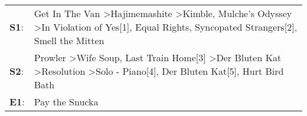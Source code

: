 \begin{supertabular}{p{0.03\textwidth}p{0.92\textwidth}}
 \textbf{S1}:  &  Get In The Van\textsuperscript{} \textgreater \enspace Hajimemashite\textsuperscript{} \textgreater \enspace Kimble\textsuperscript{}, \enspace Mulche's Odyssey\textsuperscript{} \textgreater \enspace In Violation of Yes[1]\textsuperscript{}, \enspace Equal Rights\textsuperscript{}, \enspace Syncopated Strangers[2]\textsuperscript{}, \enspace Smell the Mitten\textsuperscript{}  \enspace  \\
 \textbf{S2}:  &        Prowler\textsuperscript{} \textgreater \enspace Wife Soup\textsuperscript{}, \enspace Last Train Home[3]\textsuperscript{} \textgreater \enspace Der Bluten Kat\textsuperscript{} \textgreater \enspace Resolution\textsuperscript{} \textgreater \enspace Solo - Piano[4]\textsuperscript{}, \enspace Der Bluten Kat[5]\textsuperscript{}, \enspace Hurt Bird Bath\textsuperscript{}  \enspace  \\
 \textbf{E1}:  &                                                                                                                                                                                                                                                                                                                                                             Pay the Snucka\textsuperscript{}  \enspace  \\
\end{supertabular}
